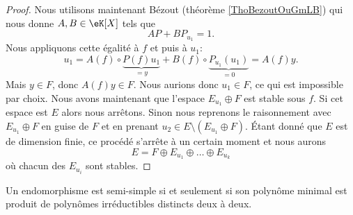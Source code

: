 \begin{proof}
    Nous utilisons maintenant Bézout (théorème \ref{ThoBezoutOuGmLB}) qui nous donne \( A,B\in \eK[X]\) tels que 
    \begin{equation}
        AP+BP_{u_1}=1.
    \end{equation}
    Nous appliquons cette égalité à \( f\) et puis à \( u_1\):
    \begin{equation}
        u_1=A(f)\circ \underbrace{P(f)u_1}_{=y}+B(f)\circ \underbrace{P_{u_1}(u_1)}_{=0}=A(f)y.
    \end{equation}
    Mais \( y\in F\), donc \( A(f)y\in F\). Nous aurions donc \( u_1\in F\), ce qui est impossible par choix. Nous avons maintenant que l'espace \( E_{u_1}\oplus F\) est stable sous \( f\). Si cet espace est \( E\) alors nous arrêtons. Sinon nous reprenons le raisonnement avec \( E_{u_1}\oplus F\) en guise de \( F\) et en prenant \( u_2\in E\setminus(E_{u_1}\oplus F)\). Étant donné que \( E\) est de dimension finie, ce procédé s'arrête à un certain moment et nous aurons
    \begin{equation}
        E=F\oplus E_{u_1}\oplus\ldots\oplus E_{u_k}
    \end{equation}
    où chacun des \( E_{u_i}\) sont stables.
\end{proof}

\begin{theorem} \label{ThoFgsxCE}
    Un endomorphisme est semi-simple si et seulement si son polynôme minimal est produit de polynômes irréductibles distincts deux à deux.
\end{theorem}

